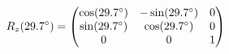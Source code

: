 \documentclass[preview]{standalone}
\begin{document}
\begin{align*}
\special{dvisvgm:raw <g id='unique000'>}R_z(29.7^\circ) = \begin{pmatrix} \cos(29.7^\circ) & -\sin(29.7^\circ) & 0 \\ \sin(29.7^\circ) & \cos(29.7^\circ) & 0 \\ 0 & 0 & 1 \end{pmatrix}\special{dvisvgm:raw </g>}
\end{align*}
\end{document}
